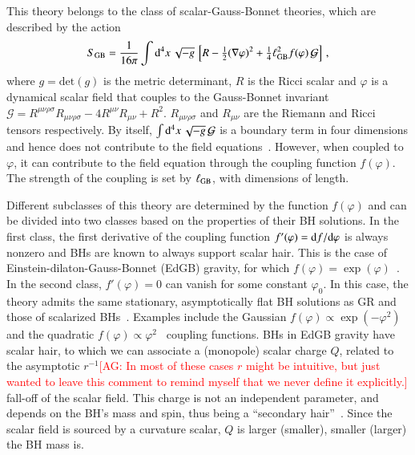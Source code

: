 \documentclass[twocolumn,
               prd,
               aps,
               superscriptaddress,
               tightenlines,
               nofootinbib,
               eqsecnum,
               amsfonts,
               amsmath,
               longbibliography]{revtex4-1}
\newcommand{\dd}{{\rm d}}
\newcommand{\dV}{{\rm d}^{4}x \, \sqrt{-g} \,}
\newcommand{\agcomm}[1]{{\textcolor{red}{{[AG: #1]}} }}
\begin{document}
This theory belongs to the class of scalar-Gauss-Bonnet theories, which are
described by the action
%
\begin{equation} \label{eq:action_sgb}
    S_{\rm GB} = \frac{1}{16 \pi}
    \int \dV
    \left[
    R - \tfrac{1}{2}(\nabla \varphi)^2
    + \tfrac{1}{4} \ell^{2}_{\rm GB} f(\varphi) \, \mathcal{G}
    \right]\,,
\end{equation}
%
where $g = \textrm{det}(g)$ is the metric determinant, $R$ is the Ricci
scalar and $\varphi$ is a dynamical scalar field that couples to the
Gauss-Bonnet invariant
%
$\mathcal{G} =
R^{\mu\nu\rho\sigma}R_{\mu\nu\rho\sigma}
- 4 R^{\mu\nu}R_{\mu\nu}
+ R^2$.
%
$R_{\mu\nu\rho\sigma}$ and $R_{\mu\nu}$ are the Riemann and Ricci tensors respectively.
%
By itself, $\int \dV \mathcal{G}$ is a boundary term in four dimensions
and hence does not contribute to the field equations~\cite{Myers:1987yn}.
%
However,  when coupled to $\varphi$, it can contribute to the field equation
through the coupling function $f(\varphi)$. The strength of the coupling is
set by $\ell_{\rm GB}$, with dimensions of length.

Different subclasses of this theory are determined by the function $f(\varphi)$
and can be divided into two classes based on the properties of their BH
solutions.
%
In the first class, the first derivative of the coupling function $f'(\varphi) = \dd f  / \dd \varphi$
is always nonzero and BHs are known to always support scalar hair.
%
This is the case of Einstein-dilaton-Gauss-Bonnet (EdGB) gravity, for which $f(\varphi) = \exp(\varphi)$~\cite{Kanti:1995vq}.
%
%
In the second class, $f'(\varphi) = 0$ can vanish for some constant $\varphi_0$.
%
In this case, the theory admits the same stationary, asymptotically flat BH
solutions as GR and those of scalarized BHs~\cite{Doneva:2017bvd,Silva:2017uqg,Macedo:2019sem,Dima:2020yac,Herdeiro:2020wei,Berti:2020kgk}.
%
Examples include the Gaussian $f(\varphi) \propto \exp(-\varphi^2)$~\cite{Doneva:2017bvd} and
the quadratic $f(\varphi) \propto \varphi^2$~\cite{Silva:2017uqg} coupling functions.
BHs in EdGB gravity have scalar hair, to which we can associate a (monopole) scalar charge $Q$,
related to the asymptotic $r^{-1}$\agcomm{In most of these cases $r$ might be intuitive, but just wanted to leave this comment to remind myself that we never define it explicitly.} fall-off of the scalar field.
%
This charge is not an independent parameter, and depends on the BH's mass and spin, %
thus being a ``secondary hair''~\cite{Coleman:1991ku,Herdeiro:2015waa}.
%
Since the scalar field is sourced by a curvature scalar, $Q$ is larger (smaller),
 smaller (larger) the BH mass is.
\end{document}
